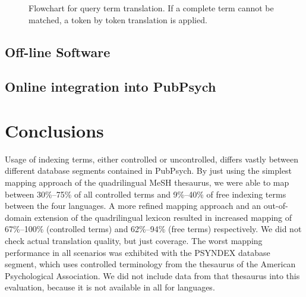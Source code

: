 \documentclass[a4paper,11pt]{article}
\begin{document}
\begin{figure}[t!]
    \caption{Flowchart for query term translation. If a complete term cannot be matched, a token by token translation is applied.}
    \vspace{-6mm}
    \label{fig:diagram}
\end{figure}

	
	\subsection{Off-line Software}

	\subsection{Online integration into PubPsych}
	
	
	\section{Conclusions}
	\label{s:conclusions}
	
	Usage of indexing terms, either controlled or uncontrolled, differs vastly between different database segments contained in PubPsych. By just using the simplest mapping approach of the quadrilingual MeSH thesaurus, we were able to map between 30\%--75\% of all controlled terms and 9\%--40\% of free indexing terms between the four languages. A more refined mapping approach and an out-of-domain extension of the quadrilingual lexicon resulted in increased mapping of 67\%--100\% (controlled terms) and 62\%--94\% (free terms) respectively. We did not check actual translation quality, but just coverage. The worst mapping performance in all scenarios was exhibited with the PSYNDEX database segment, which uses controlled terminology from the thesaurus of the American Psychological Association. We did not include data from that thesaurus into this evaluation, because it is not available in all for languages.
	
\end{document}
